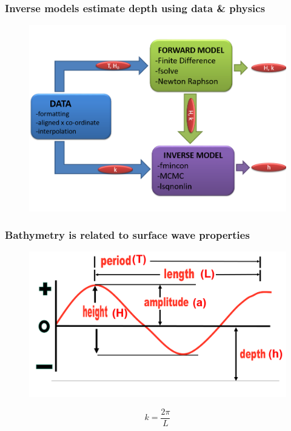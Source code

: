 \documentclass[7pt]{beamer}
\begin{document}
\begin{frame}
    \frametitle{Inverse models estimate depth using data \& physics}
    
    	\begin{figure}[H]
	 	\centering
	 	\includegraphics[width=1.0\linewidth]{img/Flow_C.png}
	\end{figure}
\end{frame}

\begin{frame}
    \frametitle{Bathymetry is related to surface wave properties}
        \begin{figure}[flowchart]
            \includegraphics[width=1.0\linewidth]{img/Wave.jpg}
        \end{figure}
        \centering
        \begin{equation}
        		k = \frac{2\pi}{L}
        \end{equation}
\end{frame}
\end{document}

